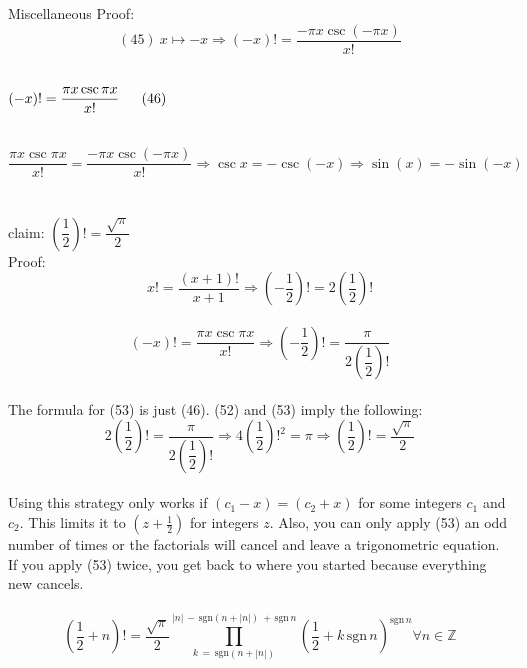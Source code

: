 \documentclass[12pt]{article}
\begin{document}
\begin{section}{Miscellaneous}
	Proof:\\
	\begin{equation}
		(45)~x\mapsto-x\Longrightarrow(-x)!=\dfrac{-\pi x\csc(-\pi x)}{x!}
	\end{equation}\\ %
	\centerline{$(-x)!=\dfrac{\pi x\csc\pi x}{x!}\hspace{1.6em}(46)$}\\
	\begin{equation}
		\dfrac{\pi x\csc\pi x}{x!}=\dfrac{-\pi x\csc(-\pi x)}{x!}\Longrightarrow\csc x=-\csc(-x)\Longrightarrow\sin(x)=-\sin(-x)
	\end{equation}\\ %
	\blacksquare\\

	\noindent claim: $\left(\dfrac12\right)!=\dfrac{\sqrt\pi}2$\\
	Proof:\\
	\begin{equation}
		x!=\dfrac{(x+1)!}{x+1}\Longrightarrow\left(-\dfrac12\right)!=2\left(\dfrac12\right)!
	\end{equation}\\ %
	\begin{equation}
		(-x)!=\dfrac{\pi x\csc\pi x}{x!}\Longrightarrow\left(-\dfrac12\right)!=\dfrac\pi{2\left(\dfrac12\right)!}
	\end{equation}\\ %
	The formula for (53) is just (46). (52) and (53) imply the following:\\
	\begin{equation}
		2\left(\dfrac12\right)!=\dfrac\pi{2\left(\dfrac12\right)!}\Longrightarrow4\left(\dfrac12\right)!^2=\pi\Longrightarrow\left(\dfrac12\right)!=\dfrac{\sqrt\pi}2
	\end{equation}\\ %
	Using this strategy only works if $(c_1-x)=(c_2+x)$ for some integers $c_1$ and $c_2$. This limits it to $(z+\frac12)$ for integers $z$. Also, you can only apply (53) an odd number of times or the factorials will cancel and leave a trigonometric equation. If you apply (53) twice, you get back to where you started because everything new cancels.\\
	\blacksquare\\

	\noindent\begin{equation}
		\left(\dfrac12+n\right)!=\dfrac{\sqrt\pi}2\prod_{k\,=\,\text{sgn}\left(n+\left|n\right|\right)}^{\left|n\right|\,-\,\text{sgn}\left(n+\left|n\right|\right)\,+\,\text{sgn}\,n}\left(\dfrac12+k\,\text{sgn}\,n\right)^{\text{sgn}\,n}\forall n\in\mathbb Z
	\end{equation} %
\end{section}
\end{document}
